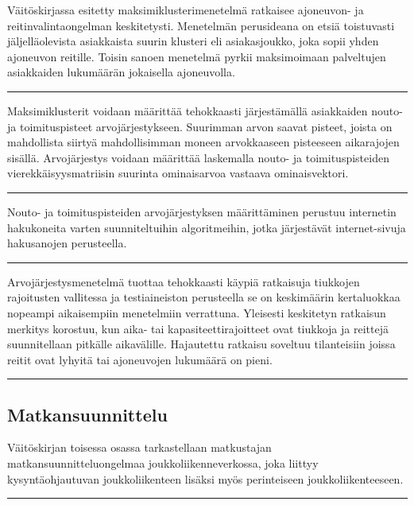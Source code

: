 \documentclass[a4paper,12pt]{article}
\newcommand*\sepline{%
  \begin{center}
    \rule[1ex]{.5\textwidth}{.5pt}
  \end{center}}
\begin{document}
Väitöskirjassa esitetty maksimiklusterimenetelmä ratkaisee ajoneuvon- ja reitinvalintaongelman keskitetysti. 
Menetelmän perusideana on etsiä toistuvasti jäljelläolevista asiakkaista suurin klusteri eli asiakasjoukko, joka sopii yhden ajoneuvon reitille. 
Toisin sanoen menetelmä pyrkii maksimoimaan palveltujen asiakkaiden lukumäärän jokaisella ajoneuvolla.

\sepline

Maksimiklusterit voidaan määrittää tehokkaasti järjestämällä asiakkaiden nouto- ja toimituspisteet arvojärjestykseen. 
Suurimman arvon saavat pisteet, joista on mahdollista siirtyä mahdollisimman moneen arvokkaaseen pisteeseen aikarajojen sisällä.
Arvojärjestys voidaan määrittää laskemalla nouto- ja toimituspisteiden vierekkäisyysmatriisin suurinta ominaisarvoa vastaava ominaisvektori.

\sepline

Nouto- ja toimituspisteiden arvojärjestyksen määrittäminen perustuu internetin hakukoneita varten suunniteltuihin algoritmeihin, 
jotka järjestävät internet-sivuja hakusanojen perusteella. 

\sepline

Arvojärjestysmenetelmä tuottaa tehokkaasti käypiä ratkaisuja tiukkojen 
rajoitusten vallitessa ja testiaineiston perusteella se on keskimäärin kertaluokkaa nopeampi aikaisempiin menetelmiin verrattuna.
Yleisesti keskitetyn ratkaisun merkitys korostuu, kun aika- tai kapasiteettirajoitteet ovat tiukkoja ja reittejä 
suunnitellaan pitkälle aikavälille. Hajautettu ratkaisu soveltuu tilanteisiin joissa reitit ovat lyhyitä tai
ajoneuvojen lukumäärä on pieni.

\sepline



\subsection*{Matkansuunnittelu}
Väitöskirjan toisessa osassa tarkastellaan matkustajan matkansuunnitteluongelmaa joukkoliikenneverkossa, joka liittyy
kysyntäohjautuvan joukkoliikenteen lisäksi myös perinteiseen joukkoliikenteeseen. 
\sepline
\end{document}
